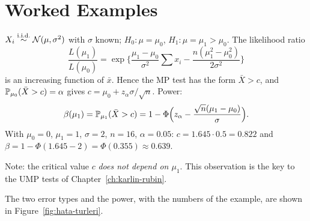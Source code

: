 \documentclass[main.tex]{subfiles}
\begin{document}
\section{Worked Examples}

\begin{example}\label{ex:normal-mp}
$X_i\iid\Normal(\mu,\sigma^2)$ with $\sigma$ known; $H_0:\mu=\mu_0$, $H_1:\mu=\mu_1>\mu_0$. The likelihood ratio
\[
\frac{L(\mu_1)}{L(\mu_0)}=\exp\Big\{\frac{\mu_1-\mu_0}{\sigma^2}\sum x_i-\frac{n(\mu_1^2-\mu_0^2)}{2\sigma^2}\Big\}
\]
is an increasing function of $\bar x$. Hence the MP test has the form $\bar X>c$, and $\P_{\mu_0}(\bar X>c)=\alpha$ gives $c=\mu_0+z_\alpha\sigma/\sqrt n$. Power:
\[
\beta(\mu_1)=\P_{\mu_1}(\bar X>c)=1-\Phi\Big(z_\alpha-\frac{\sqrt n(\mu_1-\mu_0)}{\sigma}\Big).
\]
With $\mu_0=0$, $\mu_1=1$, $\sigma=2$, $n=16$, $\alpha=0.05$: $c=1.645\cdot0.5=0.822$ and $\beta=1-\Phi(1.645-2)=\Phi(0.355)\approx0.639$.

Note: the critical value $c$ \emph{does not depend on $\mu_1$}. This observation is the key to the UMP tests of Chapter~\ref{ch:karlin-rubin}.
\end{example}

The two error types and the power, with the numbers of the example, are shown in Figure~\ref{fig:hata-turleri}.
\end{document}
